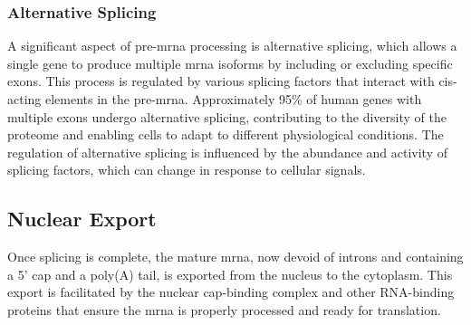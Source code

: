 \subsubsection{Alternative Splicing}
A significant aspect of pre-\gls{mrna} processing is alternative splicing, which
allows a single gene to produce multiple \gls{mrna} isoforms by including or
excluding specific exons.
This process is regulated by various splicing factors that interact with
cis-acting elements in the
pre-\gls{mrna}\supercite{le_alternative_2015,murphy_therapeutic_2022}.
Approximately 95\% of human genes with multiple exons undergo alternative
splicing, contributing to the diversity of the proteome and enabling cells to
adapt to different physiological conditions\supercite{le_alternative_2015}.
The regulation of alternative splicing is influenced by the abundance and
activity of splicing factors, which can change in response to cellular
signals\supercite{wang_mechanism_2015}.

\subsection{Nuclear Export}
Once splicing is complete, the mature \gls{mrna}, now devoid of introns and
containing a 5' cap and a poly(A) tail, is exported from the nucleus to the
cytoplasm.
This export is facilitated by the nuclear cap-binding complex and other
RNA-binding proteins that ensure the \gls{mrna} is properly processed and ready for
translation\supercite{soucek_evolutionarily_2016}.
